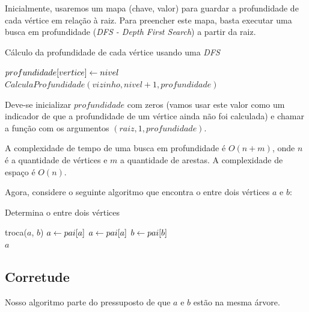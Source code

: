 Inicialmente, usaremos um mapa (chave, valor) para guardar a profundidade de cada vértice em relação à raiz. Para preencher este mapa, basta executar uma busca em profundidade (\emph{DFS - Depth First Search}) a partir da raiz.


\begin{algorithm}[H]
\caption{Cálculo da profundidade de cada vértice usando uma \emph{DFS}}
\begin{algorithmic}[1]
    \State $profundidade[vertice] \leftarrow nivel$
            \State $CalculaProfundidade(vizinho, nivel+1, profundidade)$
        \EndIf
    \EndFor
\EndFunction
\end{algorithmic}
\end{algorithm}


Deve-se inicializar $profundidade$ com zeros (vamos usar este valor como um indicador de que a profundidade de um vértice ainda não foi calculada) e chamar a função com os argumentos $(raiz, 1, profundidade)$.

A complexidade de tempo de uma busca em profundidade é $O(n+m)$, onde $n$ é a quantidade de vértices e $m$ a quantidade de arestas. A complexidade de espaço é $O(n)$.

Agora, considere o seguinte algoritmo que encontra o \LCA entre dois vértices $a$ e $b$:


\begin{algorithm}[H]
\caption{Determina o \LCA entre dois vértices}
\begin{algorithmic}[1]
        \State troca($a$, $b$)
    \EndIf
        \State $a \leftarrow pai[a]$
    \EndWhile
        \State $a \leftarrow pai[a]$
        \State $b \leftarrow pai[b]$
    \EndWhile
    \\\hspace{5mm} \Return $a$
\EndFunction
\end{algorithmic}
\end{algorithm}


\subsection{Corretude}

Nosso algoritmo parte do pressuposto de que $a$ e $b$ estão na mesma árvore.

